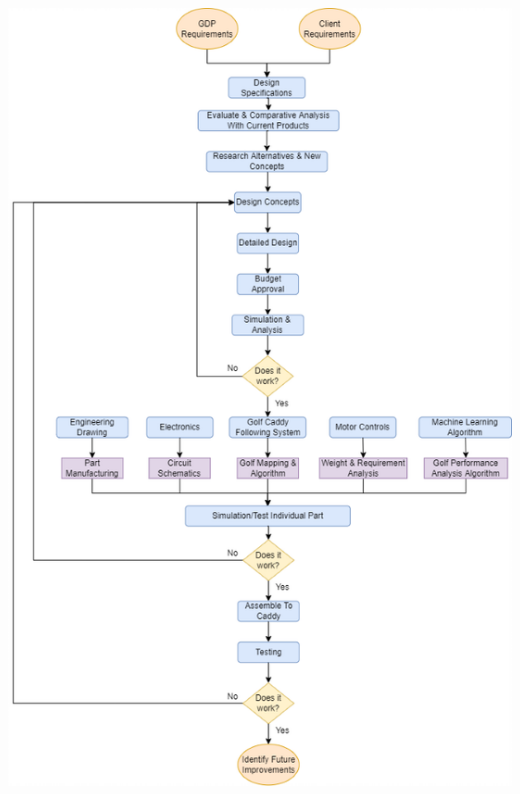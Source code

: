 \documentclass[11pt,landscape]{article}
\newenvironment{Figure}
  {\par\medskip\noindent\minipage{\linewidth}}
  {\endminipage\par\medskip}
\begin{document}
\begin{multicols}{2}
\begin{Figure} 
    \begin{center}
        \includegraphics[width=\textwidth]{design_process.png}
    \end{center}
    \label{fig:design_process}
\end{Figure}



\end{multicols}
\end{document}
